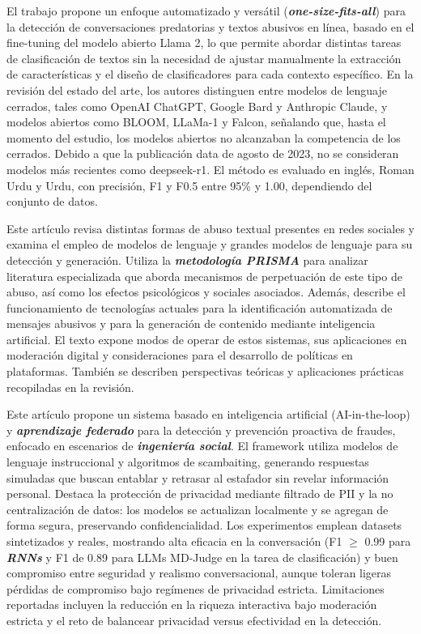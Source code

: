 El trabajo propone un enfoque automatizado y versátil (\textbf{\textit{one-size-fits-all}}) para la detección de conversaciones predatorias y textos abusivos en línea, basado en el fine-tuning del modelo abierto Llama 2, lo que permite abordar distintas tareas de clasificación de textos sin la necesidad de ajustar manualmente la extracción de características y el diseño de clasificadores para cada contexto específico. En la revisión del estado del arte, los autores distinguen entre modelos de lenguaje cerrados, tales como OpenAI ChatGPT, Google Bard y Anthropic Claude, y modelos abiertos como BLOOM, LLaMa-1 y Falcon, señalando que, hasta el momento del estudio, los modelos abiertos no alcanzaban la competencia de los cerrados. Debido a que la publicación data de agosto de 2023, no se consideran modelos más recientes como deepseek-r1. El método es evaluado en inglés, Roman Urdu y Urdu, con precisión, F1 y F0.5 entre 95\% y 1.00, dependiendo del conjunto de datos.

\cite{Nguyen2023}

Este artículo revisa distintas formas de abuso textual presentes en redes sociales y examina el empleo de modelos de lenguaje y grandes modelos de lenguaje para su detección y generación. Utiliza la \textbf{\textit{metodología PRISMA}} para analizar literatura especializada que aborda mecanismos de perpetuación de este tipo de abuso, así como los efectos psicológicos y sociales asociados. Además, describe el funcionamiento de tecnologías actuales para la identificación automatizada de mensajes abusivos y para la generación de contenido mediante inteligencia artificial. El texto expone modos de operar de estos sistemas, sus aplicaciones en moderación digital y consideraciones para el desarrollo de políticas en plataformas. También se describen perspectivas teóricas y aplicaciones prácticas recopiladas en la revisión.

\cite{DiazGarcia2025}

Este artículo propone un sistema basado en inteligencia artificial (AI-in-the-loop) y \textbf{\textit{aprendizaje federado}} para la detección y prevención proactiva de fraudes, enfocado en escenarios de \textbf{\textit{ingeniería social}}. El framework utiliza modelos de lenguaje instruccional y algoritmos de scambaiting, generando respuestas simuladas que buscan entablar y retrasar al estafador sin revelar información personal. Destaca la protección de privacidad mediante filtrado de PII y la no centralización de datos: los modelos se actualizan localmente y se agregan de forma segura, preservando confidencialidad. Los experimentos emplean datasets sintetizados y reales, mostrando alta eficacia en la conversación (F1 $\geq$ 0.99 para \textbf{\textit{RNNs}} y F1 de 0.89 para LLMs MD-Judge en la tarea de clasificación) y buen compromiso entre seguridad y realismo conversacional, aunque toleran ligeras pérdidas de compromiso bajo regímenes de privacidad estricta. Limitaciones reportadas incluyen la reducción en la riqueza interactiva bajo moderación estricta y el reto de balancear privacidad versus efectividad en la detección.

